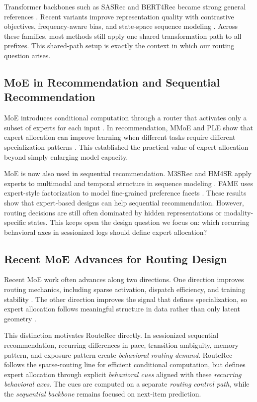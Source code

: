 \documentclass[sigconf,review,anonymous]{acmart}
\begin{document}
Transformer backbones such as SASRec and BERT4Rec became strong general references \cite{kang2018sasrec,sun2019bert4rec}. Recent variants improve representation quality with contrastive objectives, frequency-aware bias, and state-space sequence modeling \cite{qiu2022duorec,du2023fearec,liu2025sigma}. Across these families, most methods still apply one shared transformation path to all prefixes. This shared-path setup is exactly the context in which our routing question arises.

\subsection{MoE in Recommendation and Sequential Recommendation}
MoE introduces conditional computation through a router that activates only a subset of experts for each input \cite{jacobs1991adaptive,jordan1994hme}. In recommendation, MMoE and PLE show that expert allocation can improve learning when different tasks require different specialization patterns \cite{ma2018mmoe,tang2020ple}. This established the practical value of expert allocation beyond simply enlarging model capacity.

MoE is now also used in sequential recommendation. M3SRec and HM4SR apply experts to multimodal and temporal structure in sequence modeling \cite{bian2023m3srec,zhang2025hm4sr}. FAME uses expert-style factorization to model fine-grained preference facets \cite{liu2025fame}. These results show that expert-based designs can help sequential recommendation. However, routing decisions are still often dominated by hidden representations or modality-specific states. This keeps open the design question we focus on: which recurring behavioral axes in sessionized logs should define expert allocation?

\subsection{Recent MoE Advances for Routing Design}
Recent MoE work often advances along two directions. One direction improves routing mechanics, including sparse activation, dispatch efficiency, and training stability \cite{shazeer2017moe,fedus2022switch,zhou2022expertchoice,zoph2022stmoe}. The other direction improves the signal that defines specialization, so expert allocation follows meaningful structure in data rather than only latent geometry \cite{ma2018mmoe,tang2020ple}.

This distinction motivates RouteRec directly. In sessionized sequential recommendation, recurring differences in pace, transition ambiguity, memory pattern, and exposure pattern create \emph{behavioral routing demand}. RouteRec follows the sparse-routing line for efficient conditional computation, but defines expert allocation through explicit \emph{behavioral cues} aligned with these \emph{recurring behavioral axes}. The cues are computed on a separate \emph{routing control path}, while the \emph{sequential backbone} remains focused on next-item prediction.
\end{document}
